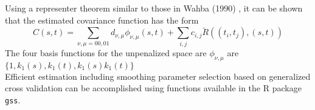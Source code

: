 \begin{frame}
Using a representer theorem similar to those in Wahba (1990) , it can be shown that the estimated covariance function has the form
\begin{equation}
		\hat{C}(s,t) = \sum_{\nu, \mu=00,01}d_{\nu,\mu}\phi_{\nu,\mu}(s,t) + \sum_{i,j}c_{i,j}\breve{R}((t_i,t_j),(s,t))
\end{equation}
 The four basis functions for the unpenalized space are $\phi_{\nu,\mu}$ are $\{ 1, k_1(s), k_1(t), k_1(s)k_1(t)  \}$\\[1cm]
Efficient estimation including smoothing parameter selection based on generalized cross validation can be accomplished using functions available in the R package {\tt gss}.
\end{frame}

